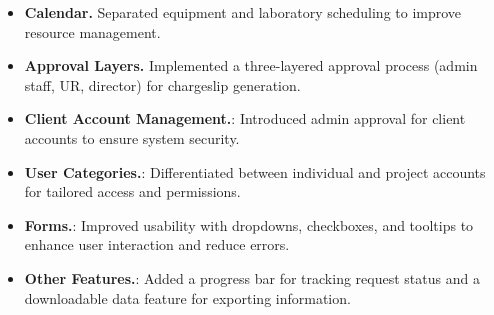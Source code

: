 \begin{itemize}
	\item \textbf{Calendar.} Separated equipment and laboratory scheduling to improve resource management.
	\item \textbf{Approval Layers.} Implemented a three-layered approval process (admin staff, UR, director) for chargeslip generation.
	\item \textbf{Client Account Management.}: Introduced admin approval for client accounts to ensure system security.
	\item \textbf{User Categories.}: Differentiated between individual and project accounts for tailored access and permissions.
	\item \textbf{Forms.}: Improved usability with dropdowns, checkboxes, and tooltips to enhance user interaction and reduce errors.
	\item \textbf{Other Features.}: Added a progress bar for tracking request status and a downloadable data feature for exporting information.
\end{itemize}

